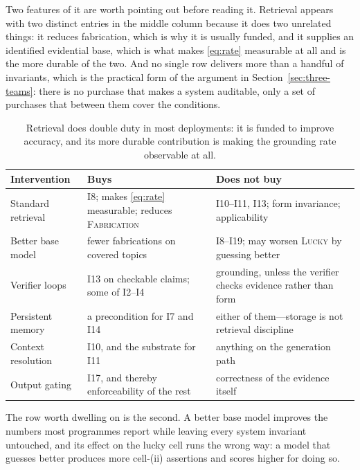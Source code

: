 Two features of it are worth pointing out before reading it. Retrieval appears with two
distinct entries in the middle column because it does two unrelated things: it reduces
fabrication, which is why it is usually funded, and it supplies an identified evidential
base, which is what makes \eqref{eq:rate} measurable at all and is the more durable of
the two. And no single row delivers more than a handful of invariants, which is the
practical form of the argument in Section~\ref{sec:three-teams}: there is no purchase
that makes a system auditable, only a set of purchases that between them cover the
conditions.

\begin{table}[ht]
  \centering
  \small
  \begin{tabular}{@{}>{\raggedright\arraybackslash}p{3.3cm}>{\raggedright\arraybackslash}p{4.6cm}>{\raggedright\arraybackslash}p{5.4cm}@{}}
    \toprule
    Intervention & Buys & Does not buy \\
    \midrule
    Standard retrieval
      & I8; makes \eqref{eq:rate} measurable; reduces \textsc{Fabrication}
      & I10--I11, I13; form invariance; applicability \\
    \addlinespace
    Better base model
      & fewer fabrications on covered topics
      & I8--I19; may worsen \textsc{Lucky} by guessing better \\
    \addlinespace
    Verifier loops
      & I13 on checkable claims; some of I2--I4
      & grounding, unless the verifier checks evidence rather than form \\
    \addlinespace
    Persistent memory
      & a precondition for I7 and I14
      & either of them---storage is not retrieval discipline \\
    \addlinespace
    Context resolution
      & I10, and the substrate for I11
      & anything on the generation path \\
    \addlinespace
    Output gating
      & I17, and thereby enforceability of the rest
      & correctness of the evidence itself \\
    \bottomrule
  \end{tabular}
  \caption{Retrieval does double duty in most deployments: it is funded to improve
    accuracy, and its more durable contribution is making the grounding rate
    observable at all.}
  \label{tab:interventions}
\end{table}

The row worth dwelling on is the second. A better base model improves the numbers
most programmes report while leaving every system invariant untouched, and its
effect on the lucky cell runs the wrong way: a model that guesses better produces
more cell-(ii) assertions and scores higher for doing so.

